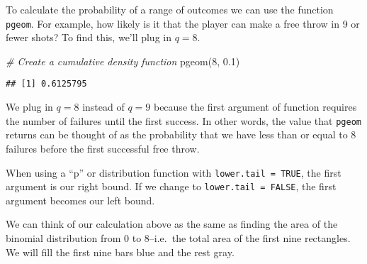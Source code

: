 \documentclass[
]{article}
\newenvironment{Shaded}{\begin{snugshade}}{\end{snugshade}}
\newcommand{\AttributeTok}[1]{\textcolor[rgb]{0.77,0.63,0.00}{#1}}
\newcommand{\CommentTok}[1]{\textcolor[rgb]{0.56,0.35,0.01}{\textit{#1}}}
\newcommand{\DecValTok}[1]{\textcolor[rgb]{0.00,0.00,0.81}{#1}}
\newcommand{\FloatTok}[1]{\textcolor[rgb]{0.00,0.00,0.81}{#1}}
\newcommand{\FunctionTok}[1]{\textcolor[rgb]{0.00,0.00,0.00}{#1}}
\newcommand{\NormalTok}[1]{#1}
\newcommand{\SpecialCharTok}[1]{\textcolor[rgb]{0.00,0.00,0.00}{#1}}
\newcommand{\StringTok}[1]{\textcolor[rgb]{0.31,0.60,0.02}{#1}}
\begin{document}
To calculate the probability of a range of outcomes we can use the function \texttt{pgeom}. For example, how likely is it that the player can make a free throw in 9 or fewer shots? To find this, we'll plug in \(q = 8\).

\begin{Shaded}
\begin{Highlighting}[]
\CommentTok{\# Create a cumulative density function}
\FunctionTok{pgeom}\NormalTok{(}\DecValTok{8}\NormalTok{, }\FloatTok{0.1}\NormalTok{)}
\end{Highlighting}
\end{Shaded}

\begin{verbatim}
## [1] 0.6125795
\end{verbatim}

We plug in \(q=8\) instead of \(q=9\) because the first argument of function requires the number of failures until the first success. In other words, the value that \texttt{pgeom} returns can be thought of as the probability that we have less than or equal to 8 failures before the first successful free throw.

When using a ``p'' or distribution function with \texttt{lower.tail\ =\ TRUE}, the first argument is our right bound. If we change to \texttt{lower.tail\ =\ FALSE}, the first argument becomes our left bound.

We can think of our calculation above as the same as finding the area of the binomial distribution from 0 to 8--i.e.~the total area of the first nine rectangles. We will fill the first nine bars blue and the rest gray.

\begin{Shaded}
\end{Shaded}
\end{document}
